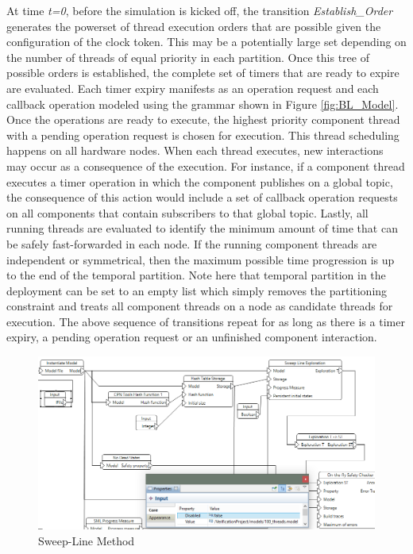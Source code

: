 At time \emph{t=0}, before the simulation is kicked off, the transition \emph{Establish\_Order} generates the powerset of thread execution orders that are possible given the configuration of the clock token. This may be a potentially large set depending on the number of threads of equal priority in each partition. Once this tree of possible orders is established, the complete set of timers that are ready to expire are evaluated. Each timer expiry manifests as an operation request and each callback operation modeled using the grammar shown in Figure \ref{fig:BL_Model}. Once the operations are ready to execute, the highest priority component thread with a pending operation request is chosen for execution. This thread scheduling happens on all hardware nodes. When each thread executes, new interactions may occur as a consequence of the execution. For instance, if a component thread executes a timer operation in which the component publishes on a global topic, the consequence of this action would include a set of callback operation requests on all components that contain subscribers to that global topic. Lastly, all running threads are evaluated to identify the minimum amount of time that can be safely fast-forwarded in each node. If the running component threads are independent or symmetrical, then the maximum possible time progression is up to the end of the temporal partition. Note here that temporal partition in the deployment can be set to an empty list which simply removes the  partitioning constraint and treats all component threads on a node as candidate threads for execution. The above sequence of transitions repeat for as long as there is a timer expiry, a pending operation request or an unfinished component interaction. 

\begin{figure}[h]
	\centering
	\includegraphics[width=\textwidth]{./figs/sl}
	\caption{Sweep-Line Method}
	\label{fig:sl}
\end{figure}

